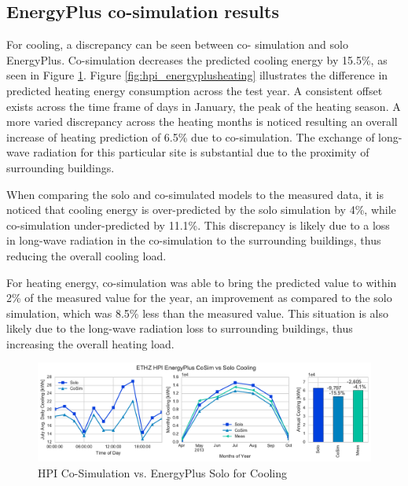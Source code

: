 \documentclass{tBPS2e}
\theoremstyle{plain}
\theoremstyle{definition}
\theoremstyle{remark}
\begin{document}
\subsection{EnergyPlus co-simulation results}
For cooling, a discrepancy can be seen between co-
simulation and solo EnergyPlus. Co-simulation decreases the predicted cooling energy by 15.5\%, as seen in Figure
\ref{fig:hpi_energypluscooling}. Figure \ref{fig:hpi_energyplusheating}
illustrates the difference in predicted heating energy consumption across the
test year. A consistent offset exists across the time frame of days in
January, the peak of the heating season. A more varied discrepancy across the
heating months is noticed resulting an overall increase of heating prediction
of 6.5\% due to co-simulation. The exchange of long-wave radiation for this
particular site is substantial due to the proximity of surrounding buildings.


When comparing the solo and co-simulated models to the measured data, it is noticed that 
cooling energy is over-predicted by the solo simulation by 4\%, while co-simulation under-predicted 
by 11.1\%. This discrepancy is likely due to a loss in long-wave radiation in the co-simulation to the surrounding buildings, thus reducing the overall 
cooling load. 

For heating energy, co-simulation was able to bring the predicted value to within 2\% of 
the measured value for the year, an improvement as compared to the solo simulation, which was 8.5\% less than the measured value. This situation is also 
likely due to the long-wave radiation loss to surrounding buildings, thus increasing the overall heating load.


\begin{figure}[H]
\centering
\includegraphics[scale=0.55]{figures/HPI_EnergyPlus_Cooling}
\caption{HPI Co-Simulation vs. EnergyPlus Solo for Cooling}
\label{fig:hpi_energypluscooling}
\end{figure}
\end{document}
